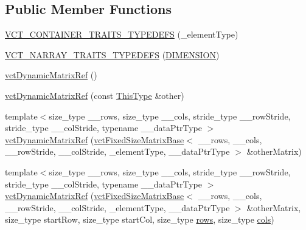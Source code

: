 \subsection*{Public Member Functions}
\begin{DoxyCompactItemize}
\item 
\hyperlink{classvct_dynamic_matrix_ref_ad0afc0e12b9aa45b3b7f86c9c20210bc}{V\+C\+T\+\_\+\+C\+O\+N\+T\+A\+I\+N\+E\+R\+\_\+\+T\+R\+A\+I\+T\+S\+\_\+\+T\+Y\+P\+E\+D\+E\+F\+S} (\+\_\+element\+Type)
\item 
\hyperlink{classvct_dynamic_matrix_ref_a31b115e4d57772c29d3bd6594c94dd9a}{V\+C\+T\+\_\+\+N\+A\+R\+R\+A\+Y\+\_\+\+T\+R\+A\+I\+T\+S\+\_\+\+T\+Y\+P\+E\+D\+E\+F\+S} (\hyperlink{group__cisst_vector_gga296ccb28efb27cc7c51864f9e81b77eca26570951ef99650f548cdec008ae4444}{D\+I\+M\+E\+N\+S\+I\+O\+N})
\item 
\hyperlink{classvct_dynamic_matrix_ref_ab235b68c2cebc19b68040b3fd9f5147a}{vct\+Dynamic\+Matrix\+Ref} ()
\item 
\hyperlink{classvct_dynamic_matrix_ref_a020565b599ed5ddc765184d60fd239e7}{vct\+Dynamic\+Matrix\+Ref} (const \hyperlink{classvct_dynamic_matrix_ref_ac01200e3df0afe95f5d3948da84c8551}{This\+Type} \&other)
\item 
{\footnotesize template$<$size\+\_\+type \+\_\+\+\_\+rows, size\+\_\+type \+\_\+\+\_\+cols, stride\+\_\+type \+\_\+\+\_\+row\+Stride, stride\+\_\+type \+\_\+\+\_\+col\+Stride, typename \+\_\+\+\_\+data\+Ptr\+Type $>$ }\\\hyperlink{classvct_dynamic_matrix_ref_aca2bfa15f7345b8f91a9d6f800e4ad7c}{vct\+Dynamic\+Matrix\+Ref} (\hyperlink{classvct_fixed_size_matrix_base}{vct\+Fixed\+Size\+Matrix\+Base}$<$ \+\_\+\+\_\+rows, \+\_\+\+\_\+cols, \+\_\+\+\_\+row\+Stride, \+\_\+\+\_\+col\+Stride, \+\_\+element\+Type, \+\_\+\+\_\+data\+Ptr\+Type $>$ \&other\+Matrix)
\item 
{\footnotesize template$<$size\+\_\+type \+\_\+\+\_\+rows, size\+\_\+type \+\_\+\+\_\+cols, stride\+\_\+type \+\_\+\+\_\+row\+Stride, stride\+\_\+type \+\_\+\+\_\+col\+Stride, typename \+\_\+\+\_\+data\+Ptr\+Type $>$ }\\\hyperlink{classvct_dynamic_matrix_ref_a7c062ad630ab45b933928d8031fb438c}{vct\+Dynamic\+Matrix\+Ref} (\hyperlink{classvct_fixed_size_matrix_base}{vct\+Fixed\+Size\+Matrix\+Base}$<$ \+\_\+\+\_\+rows, \+\_\+\+\_\+cols, \+\_\+\+\_\+row\+Stride, \+\_\+\+\_\+col\+Stride, \+\_\+element\+Type, \+\_\+\+\_\+data\+Ptr\+Type $>$ \&other\+Matrix, size\+\_\+type start\+Row, size\+\_\+type start\+Col, size\+\_\+type \hyperlink{classvct_dynamic_const_matrix_base_a5eac13be2207ebeb8766cde379d73438}{rows}, size\+\_\+type \hyperlink{classvct_dynamic_const_matrix_base_aa6c51d41a100da49a7e7ac7edb20ecd9}{cols})

\end{DoxyCompactItemize}
